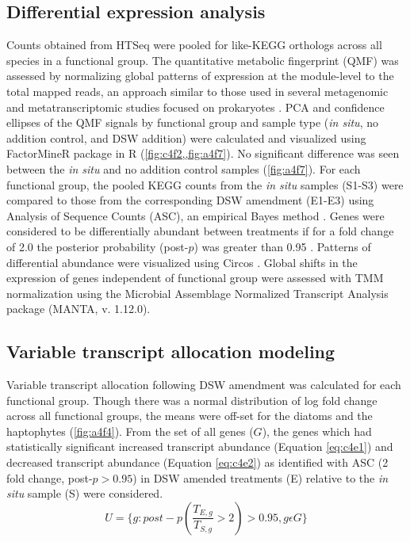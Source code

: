 \subsection{Differential expression analysis}
Counts obtained from HTSeq were pooled for like-KEGG orthologs across all species in a functional group. The quantitative metabolic fingerprint (QMF) was assessed by normalizing global patterns of expression at the module-level to the total mapped reads, an approach similar to those used in several metagenomic and metatranscriptomic studies focused on prokaryotes \citep{Shi2011, Ottesen2014, Shi2012}. PCA and confidence ellipses of the QMF signals by functional group and sample type (\textit{in situ}, no addition control, and DSW addition) were calculated and visualized using FactorMineR package in R (\cref{fig:c4f2,,fig:a4f7}). No significant difference was seen between the \textit{in situ} and no addition control samples (\cref{fig:a4f7}). For each functional group, the pooled KEGG counts from the \textit{in situ} samples (S1-S3) were compared to those from the corresponding DSW amendment (E1-E3) using Analysis of Sequence Counts (ASC), an empirical Bayes method \citep{Wu2010}. Genes were considered to be differentially abundant between treatments if for a fold change of 2.0 the posterior probability (post-$p$) was greater than 0.95 \citep{Dyhrman2012}. Patterns of differential abundance were visualized using Circos \citep{Krzywinski2009}. Global shifts in the expression of genes independent of functional group were assessed with TMM normalization using the Microbial Assemblage Normalized Transcript Analysis package (MANTA, v. 1.12.0)\citep{Marchetti2012a}. \par
\subsection{Variable transcript allocation modeling} 
Variable transcript allocation following DSW amendment was calculated for each functional group. Though there was a normal distribution of log fold change across all functional groups, the means were off-set for the diatoms and the haptophytes (\cref{fig:a4f4}). From the set of all genes ($G$), the genes which had statistically significant increased transcript abundance (Equation \ref{eq:c4e1}) and decreased transcript abundance (Equation \ref{eq:c4e2}) as identified with ASC (2 fold change, post-$p > 0.95$) \citep{Wu2010} in DSW amended treatments (E) relative to the \textit{in situ} sample (S) were considered. 
\begin{equation}
	\label{eq:c4e1}
	 U = \{g : post-p(\frac{T_{E,g}}{T_{S,g}} > 2) > 0.95, g \epsilon G\}
\end{equation}

